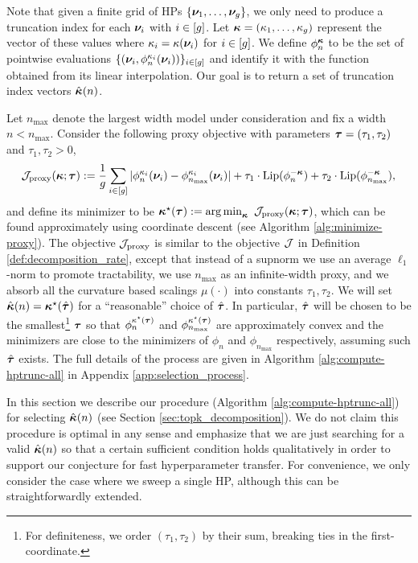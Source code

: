Note that given a finite grid of HPs $\{\bm{\nu}_1, \ldots, \bm{\nu}_{g}\}$, we only need to produce a truncation index for each $\bm{\nu}_i$ with $i \in [g]$.  Let $\bm{\kappa} = (\kappa_1, \ldots, \kappa_{g})$  represent the vector of these values where $\kappa_i = \kappa(\bm{\nu}_i)$ for $i \in [g]$. We define $\phi_n^{\bm{\kappa}}$ to be the set of pointwise evaluations $\{(\bm{\nu}_i, \phi_n^{\kappa_i}(\bm{\nu}_i))\}_{i \in [g]}$ and identify it with the function obtained from its linear interpolation. Our goal is to return a set of truncation index vectors $\hat{\bm{\kappa}}(n)$.

Let $n_{\max}$ denote the largest width model under consideration and fix a width $n < n_{\max}$. Consider the following proxy objective with parameters $\boldsymbol{\tau} = (\tau_1, \tau_2)$ and $\tau_1, \tau_2 > 0$,
\begin{equation}\label{eq:decomp_objective_proxy}
    \mathcal{J}_{\mathrm{proxy}}(\bm{\kappa}; \boldsymbol{\tau}) := \frac{1}{g} \sum\limits_{i \in [g]} |\phi_n^{\kappa_i}(\bm{\nu}_i) - \phi_{n_{\max}}^{\kappa_i}(\bm{\nu}_i)| + \tau_1 \cdot\mathrm{Lip}(\phi_n^{-\bm{\kappa}}) + \tau_2 \cdot \mathrm{Lip}(\phi_{n_{\max}}^{-\bm{\kappa}}),
\end{equation}
and define its minimizer to be $\bm{\kappa}^\star(\boldsymbol{\tau}) := \operatorname*{arg\,min}_{\bm{\kappa}}~\mathcal{J}_{\mathrm{proxy}}(\bm{\kappa}; \boldsymbol{\tau})$, which can be found approximately using coordinate descent (see Algorithm \ref{alg:minimize-proxy}). The objective $\mathcal{J}_{\mathrm{proxy}}$ is similar to the objective $\mathcal{J}$ in Definition \ref{def:decomposition_rate}, except that instead of a supnorm we use an average $\ell_1$-norm to promote tractability, we use $n_{\max}$ as an infinite-width proxy, and we absorb all the curvature based scalings $\mu(\cdot)$ into constants $\tau_1, \tau_2$. We will set $\hat{\bm{\kappa}}(n) = \bm{\kappa}^\star(\hat{
\boldsymbol{\tau}})$ for a ``reasonable'' choice of $\hat{\boldsymbol{\tau}}$. In particular, $\hat{\boldsymbol{\tau}}$ will be chosen to be the smallest\footnote{For definiteness, we order $(\tau_1, \tau_2)$ by their sum, breaking ties in the first-coordinate.} $\boldsymbol{\tau}$ so that $\phi_n^{\kappa^\star(\boldsymbol{\tau})}$ and $\phi_{n_{\max}}^{\kappa^\star(\boldsymbol{\tau})}$ are approximately convex and the minimizers are close to the minimizers of $\phi_n$ and $\phi_{n_{\max}}$ respectively, assuming such $\hat{\boldsymbol{\tau}}$ exists. The full details of the process are given in Algorithm \ref{alg:compute-hptrunc-all} in Appendix \ref{app:selection_process}.

In this section we describe our procedure (Algorithm \ref{alg:compute-hptrunc-all}) for selecting $\hat{\bm{\kappa}}(n)$ (see Section \ref{sec:topk_decomposition}).  We do not claim this procedure is optimal in any sense and emphasize that we are just searching for a valid $\hat{\bm{\kappa}}(n)$ so that a certain sufficient condition holds qualitatively in order to support our conjecture for fast hyperparameter transfer. For convenience, we only consider the case where we sweep a single HP, although this can be straightforwardly extended. 

